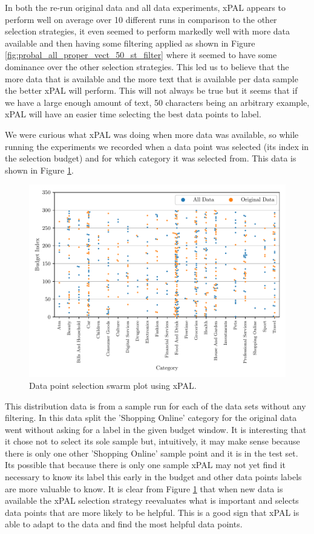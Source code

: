 In both the re-run original data and all data experiments, xPAL appears to perform well on average over 10 different runs in comparison to the other selection strategies, it even seemed to perform markedly well with more data available and then having some filtering applied as shown in Figure \ref{fig:probal_all_proper_vect_50_st_filter} where it seemed to have some dominance over the other selection strategies. This led us to believe that the more data that is available and the more text that is available per data sample the better xPAL will perform. This will not always be true but it seems that if we have a large enough amount of text, 50 characters being an arbitrary example, xPAL will have an easier time selecting the best data points to label.

We were curious what xPAL was doing when more data was available, so while running the experiments we recorded when a data point was selected (its index in the selection budget) and for which category it was selected from. This data is shown in Figure \ref{fig:xpal_data_selection}.

\begin{figure}[ht]
  \centering
  \includegraphics[width=\textwidth]{../img/plot_xpal_selection_dist.pdf}
  \caption{Data point selection swarm plot using xPAL.}
  \label{fig:xpal_data_selection}
\end{figure}

This distribution data is from a sample run for each of the data sets without any filtering. In this data split the 'Shopping Online' category for the original data went without asking for a label in the given budget window. It is interesting that it chose not to select its sole sample but, intuitively, it may make sense because there is only one other 'Shopping Online' sample point and it is in the test set. Its possible that because there is only one sample xPAL may not yet find it necessary to know its label this early in the budget and other data points labels are more valuable to know. It is clear from Figure \ref{fig:xpal_data_selection} that when new data is available the xPAL selection strategy reevaluates what is important and selects data points that are more likely to be helpful. This is a good sign that xPAL is able to adapt to the data and find the most helpful data points.


